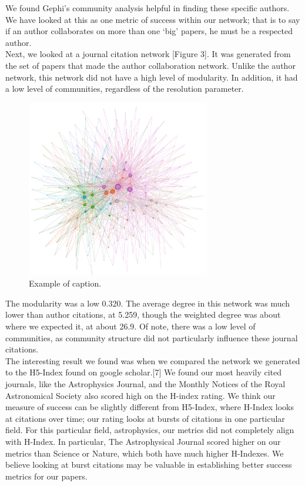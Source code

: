 \documentclass[times, 10pt,twocolumn]{article}
\begin{document}
We found Gephi’s community analysis helpful in finding these specific authors. We have looked at this as one metric of success within our network; that is to say if an author collaborates on more than one ‘big’ papers, he must be a respected author. \\

Next, we looked at a journal citation network [Figure 3]. It was generated from the set of papers that made the author collaboration network. Unlike the author network, this network did not have a high level of modularity. In addition, it had a low level of communities, regardless of the resolution parameter. \\

\begin{figure}[h]
   \includegraphics[width=8cm]{figure3.png}
   \caption{Example of caption.}
\end{figure}

The modularity was a low 0.320. The average degree in this network was much lower than author citations, at 5.259, though the weighted degree was about where we expected it, at about 26.9. Of note, there was a low level of communities, as community structure did not particularly influence these journal citations.\\

The interesting result we found was when we compared the network we generated to the H5-Index found on google scholar.[7] We found our most heavily cited journals, like the Astrophysics Journal, and the Monthly Notices of the Royal Astronomical Society also scored high on the H-index rating. We think our measure of success can be slightly different from H5-Index, where H-Index looks at citations over time; our rating looks at bursts of citations in one particular field. For this particular field, astrophysics, our metrics did not completely align with H-Index. In particular, The Astrophysical Journal scored higher on our metrics than Science or Nature, which both have much higher H-Indexes. We believe looking at burst citations may be valuable in establishing better success metrics for our papers.\\
\end{document}
